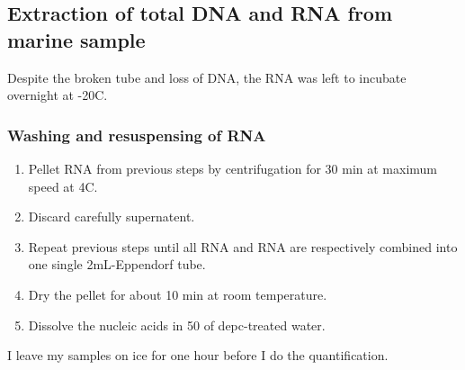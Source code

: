\subsection{Extraction of total DNA and RNA from marine sample}
\label{task:20180110_cj0}

Despite the broken tube and loss of DNA, the RNA was left to incubate overnight at -20\degree C. 

\subsubsection{Washing and resuspensing of RNA}

\begin{enumerate}
\item Pellet RNA from previous steps by centrifugation for 30 min at maximum speed at 4\degree C.
\item Discard carefully supernatent.
\item Repeat previous steps until all RNA and RNA are respectively combined into one single 2mL-Eppendorf tube.
\item Dry the pellet for about 10 min at room temperature.
\item Dissolve the nucleic acids in 50 \uL of \gls{depc}-treated water.
\end{enumerate}


I leave my samples on ice for one hour before I do the quantification.